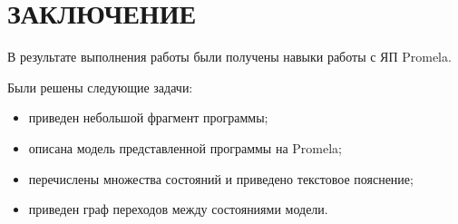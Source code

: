 \section*{ЗАКЛЮЧЕНИЕ}

В результате выполнения работы были получены навыки работы с ЯП Promela.

Были решены следующие задачи:
\begin{itemize}
	\item приведен небольшой фрагмент программы;
	\item описана модель представленной программы на Promela;
	\item перечислены множества состояний и приведено текстовое пояснение;
	\item приведен граф переходов между состояниями модели.
\end{itemize}

\pagebreak